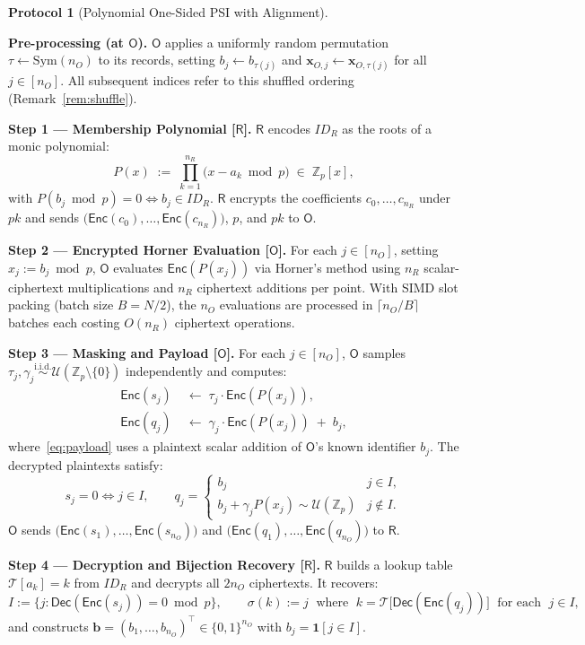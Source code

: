 \documentclass[12pt]{article}
\theoremstyle{definition}
\newtheorem{protocol}{Protocol}[section]
\theoremstyle{plain}
\newcommand{\Enc}[1]{\mathsf{Enc}\!\left(#1\right)}
\newcommand{\Dec}[1]{\mathsf{Dec}\!\left(#1\right)}
\newcommand{\bb}{\mathbf{b}}
\newcommand{\Party}[1]{\textsf{#1}}
\newcommand{\pk}{\mathit{pk}}
\begin{document}
\begin{protocol}[Polynomial One-Sided PSI with Alignment]
\label{prot:psi}
\hfill

\smallskip
\textbf{Pre-processing (at $\Party{O}$).}
$\Party{O}$ applies a uniformly random permutation $\tau \leftarrow
\mathrm{Sym}(n_O)$ to its records, setting $b_j \leftarrow b_{\tau(j)}$
and $\mathbf{x}_{O,j} \leftarrow \mathbf{x}_{O,\tau(j)}$ for all
$j \in [n_O]$. All subsequent indices refer to this shuffled ordering
(Remark~\ref{rem:shuffle}).

\smallskip
\textbf{Step 1 --- Membership Polynomial [$\Party{R}$].}
$\Party{R}$ encodes $\mathit{ID}_R$ as the roots of a monic polynomial:
\begin{equation}
  P(x) \;:=\; \prod_{k=1}^{n_R}\bigl(x - a_k \bmod p\bigr)
  \;\in\; \mathbb{Z}_p[x],
  \label{eq:poly}
\end{equation}
with $P(b_j \bmod p) = 0 \iff b_j \in \mathit{ID}_R$. $\Party{R}$ encrypts
the coefficients $c_0, \ldots, c_{n_R}$ under $\pk$ and sends
$\bigl(\Enc{c_0}, \ldots, \Enc{c_{n_R}}\bigr)$, $p$, and $\pk$ to
$\Party{O}$.

\smallskip
\textbf{Step 2 --- Encrypted Horner Evaluation [$\Party{O}$].}
For each $j \in [n_O]$, setting $x_j := b_j \bmod p$, $\Party{O}$
evaluates $\Enc{P(x_j)}$ via Horner's method using $n_R$ scalar-ciphertext
multiplications and $n_R$ ciphertext additions per point. With SIMD slot
packing (batch size $B = N/2$), the $n_O$ evaluations are processed in
$\lceil n_O/B \rceil$ batches each costing $O(n_R)$ ciphertext operations.

\smallskip
\textbf{Step 3 --- Masking and Payload [$\Party{O}$].}
For each $j \in [n_O]$, $\Party{O}$ samples
$\tau_j, \gamma_j \overset{\mathrm{i.i.d.}}{\sim}
\mathcal{U}(\mathbb{Z}_p \setminus \{0\})$ independently and computes:
\begin{align}
  \Enc{s_j} &\;\leftarrow\; \tau_j \cdot \Enc{P(x_j)},
  \label{eq:flag} \\
  \Enc{q_j} &\;\leftarrow\; \gamma_j \cdot \Enc{P(x_j)} \;+\; b_j,
  \label{eq:payload}
\end{align}
where~\eqref{eq:payload} uses a plaintext scalar addition of $\Party{O}$'s
known identifier $b_j$. The decrypted plaintexts satisfy:
\[
  s_j = 0 \iff j \in I,
  \qquad
  q_j = \begin{cases} b_j & j \in I, \\ b_j + \gamma_j P(x_j) \sim \mathcal{U}(\mathbb{Z}_p) & j \notin I. \end{cases}
\]
$\Party{O}$ sends $\bigl(\Enc{s_1},\ldots,\Enc{s_{n_O}}\bigr)$ and
$\bigl(\Enc{q_1},\ldots,\Enc{q_{n_O}}\bigr)$ to $\Party{R}$.

\smallskip
\textbf{Step 4 --- Decryption and Bijection Recovery [$\Party{R}$].}
$\Party{R}$ builds a lookup table $\mathcal{T}[a_k] = k$ from
$\mathit{ID}_R$ and decrypts all $2n_O$ ciphertexts. It recovers:
\[
  I := \{j : \Dec{\Enc{s_j}} = 0 \bmod p\},
  \qquad
  \sigma(k) := j \;\text{ where }\; k = \mathcal{T}\!\bigl[\Dec{\Enc{q_j}}\bigr]
  \;\text{ for each }\; j \in I,
\]
and constructs $\bb = (b_1, \ldots, b_{n_O})^\top \in \{0,1\}^{n_O}$ with
$b_j = \mathbf{1}[j \in I]$.
\end{protocol}
\end{document}
